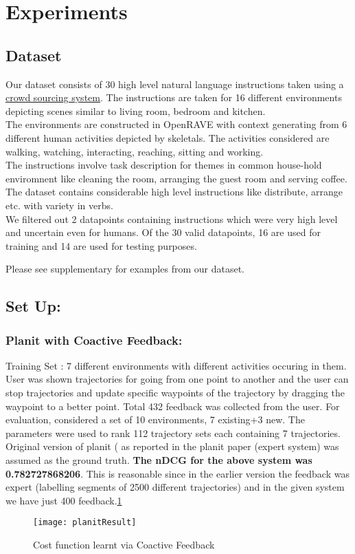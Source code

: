 \section{Experiments}
\subsection{Dataset}
Our dataset consists of 30 high level natural language instructions taken using a \href{http://52.25.65.189:9000/#/getFeedback}{crowd sourcing system}. The instructions are taken for 16 different environments depicting scenes similar to living room, bedroom and kitchen. \\
The environments are constructed in OpenRAVE with context generating from 6 different human activities depicted by skeletals. The activities considered are walking, watching, interacting, reaching, sitting and working. \\
The instructions involve task description for themes in common house-hold enviromnent like cleaning the room, arranging the guest room and serving coffee. The dataset contains considerable high level instructions like distribute, arrange etc. with variety in verbs.\\
We filtered out 2 datapoints containing instructions which were very high level and uncertain even for  humans. Of the 30 valid datapoints, 16 are used for training and 14 are used for testing purposes.  

Please see supplementary for examples from our dataset.

\subsection{Set Up:}
	\subsubsection{Planit with Coactive Feedback:} 
		Training Set : 7 different environments with different activities occuring in them. User was shown trajectories for going from one point to another and the user can stop trajectories and update specific waypoints of the trajectory by dragging the waypoint to a better point. Total 432 feedback was collected from the user. For evaluation, considered a set of 10 environments, 7 existing+3 new. The parameters were used to rank 112 trajectory sets each containing 7 trajectories. Original version of planit ( as reported in the planit paper (expert system) was assumed as the ground truth. \textbf{The nDCG for the above system was 0.782727868206}. This is reasonable since in the earlier version the feedback was expert (labelling segments of 2500 different trajectories) and in the given system we have just 400 feedback.\ref{fig:planitResult} 
		\begin{figure}[h]
		\texttt{[image: planitResult]}
		\centering
		\caption{Cost function learnt via Coactive Feedback}
  		\label{fig:planitResult}
		\end{figure}


